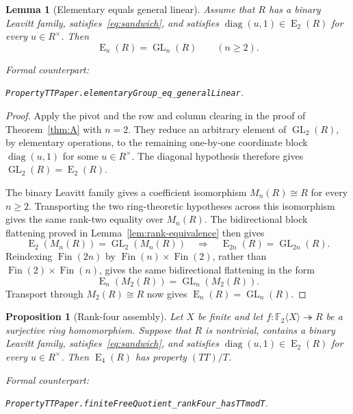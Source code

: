 \documentclass[11pt]{amsart}
\newif\ifanonymous\anonymoustrue
\newcommand{\leanrepo}{[repository link removed for anonymous review]}
\newcommand{\leanrepo}{https://github.com/SauersML/group-approximation}
\newcommand{\leanverified}[2]{%
  \par\smallskip\noindent
  {\normalfont\footnotesize\color{gray!70!black}%
  Formal counterpart:\par\nobreak\noindent
  \ifanonymous\nolinkurl{#2}\else
  \href{\leanrepo/blob/main/GroupApproximation/#1.lean}{\nolinkurl{#2}}\fi.}}
\newtheorem{proposition}[theorem]{Proposition}
\newtheorem{lemma}[theorem]{Lemma}
\theoremstyle{definition}
\theoremstyle{plain}
\newcommand{\F}{\mathbb F}
\newcommand{\GL}{\operatorname{GL}}
\newcommand{\EL}{\operatorname{E}}
\newcommand{\diag}{\operatorname{diag}}
\begin{document}
\begin{lemma}[Elementary equals general linear]\label{lem:gl-el}
Assume that \(R\) has a binary Leavitt family, satisfies~\eqref{eq:sandwich},
and satisfies
\(\diag(u,1)\in\EL_2(R)\) for every \(u\in R^\times\).  Then
\[
  \EL_n(R)=\GL_n(R)\qquad(n\ge2).
\]
\leanverified{PropertyTT/PaperStatements}{PropertyTTPaper.elementaryGroup_eq_generalLinear}
\end{lemma}

\begin{proof}
Apply the pivot and the row and column clearing in the proof of
Theorem~\ref{thm:A} with \(n=2\).  They reduce an arbitrary element
of \(\GL_2(R)\), by elementary operations, to the remaining
one-by-one coordinate block \(\diag(u,1)\) for some
\(u\in R^\times\).  The diagonal hypothesis
therefore gives \(\GL_2(R)=\EL_2(R)\).

The binary Leavitt family gives a coefficient isomorphism
\(M_n(R)\cong R\) for every \(n\ge2\).  Transporting the two
ring-theoretic hypotheses across this isomorphism gives the same
rank-two equality over \(M_n(R)\).  The bidirectional block
flattening proved in Lemma~\ref{lem:rank-equivalence} then gives
\[
  \EL_2(M_n(R))=\GL_2(M_n(R))
  \quad\Longrightarrow\quad
  \EL_{2n}(R)=\GL_{2n}(R).
\]
Reindexing \(\operatorname{Fin}(2n)\) by
\(\operatorname{Fin}(n)\times\operatorname{Fin}(2)\), rather than
\(\operatorname{Fin}(2)\times\operatorname{Fin}(n)\), gives the same
bidirectional flattening in the form
\[
  \EL_n(M_2(R))=\GL_n(M_2(R)).
\]
Transport through \(M_2(R)\cong R\) now gives
\(\EL_n(R)=\GL_n(R)\).
\end{proof}

\begin{proposition}[Rank-four assembly]\label{prop:rank-four}
Let \(X\) be finite and let
\(f:\F_2\langle X\rangle\twoheadrightarrow R\) be a surjective ring
homomorphism.  Suppose that \(R\) is nontrivial, contains a binary
Leavitt family, satisfies~\eqref{eq:sandwich}, and satisfies
\(\diag(u,1)\in\EL_2(R)\) for every \(u\in R^\times\).  Then
\(\EL_4(R)\) has property \((TT)/T\).
\leanverified{PropertyTT/PaperStatements}{PropertyTTPaper.finiteFreeQuotient_rankFour_hasTTmodT}
\end{proposition}
\end{document}
